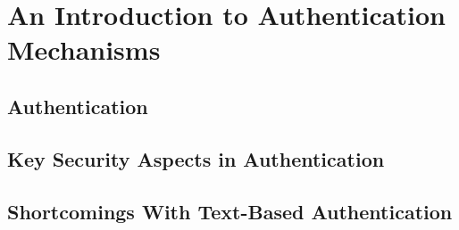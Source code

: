 \chapter{An Introduction to Authentication Mechanisms} \label{chap:background}

	{\bf \color{red}{Hva bør jeg ha med her?}}

	\section{Authentication} \label{sec:authentication}

	\section{Key Security Aspects in Authentication} \label{sec:entropy}

	\section{Shortcomings With Text-Based Authentication} \label{sec:shortcomings}